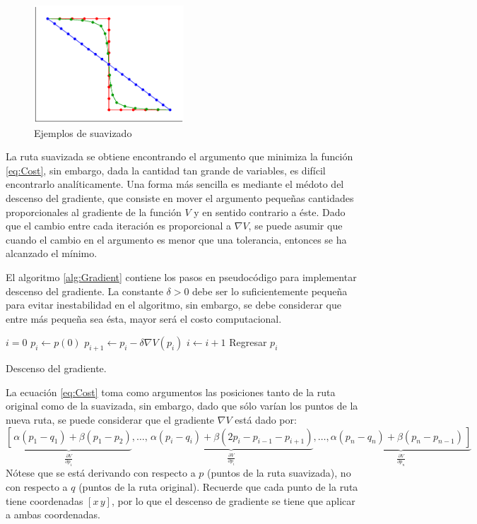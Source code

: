 \documentclass[letterpaper,12pt]{article}
\newcommand\ddfrac[2]{\frac{\displaystyle #1}{\displaystyle #2}}
\begin{document}
\begin{figure}
\centering
\includegraphics[width=0.5\textwidth]{Figures/Smooth.eps}
\caption{Ejemplos de suavizado}
\label{fig:Smooth}
\end{figure}

La ruta suavizada se obtiene encontrando el argumento que minimiza la función \ref{eq:Cost}, sin embargo, dada la cantidad tan grande de variables, es difícil encontrarlo analíticamente. Una forma más sencilla es mediante el médoto del descenso del gradiente, que consiste en mover el argumento pequeñas cantidades proporcionales al gradiente de la función $V$ y en sentido contrario a éste. Dado que el cambio entre cada iteración es proporcional a $\nabla V$, se puede asumir que cuando el cambio en el argumento es menor que una tolerancia, entonces se ha alcanzado el mínimo. 

El algoritmo \ref{alg:Gradient} contiene los pasos en pseudocódigo para implementar descenso del gradiente. La constante $\delta > 0$ debe ser lo suficientemente pequeña para evitar inestabilidad en el algoritmo, sin embargo, se debe considerar que entre más pequeña sea ésta, mayor será el costo computacional. 

\begin{algorithm}
\DontPrintSemicolon
{}
$i = 0$\;
$p_i \leftarrow p(0)$\;
{
\BlankLine
  $p_{i+1} \leftarrow p_i - \delta\nabla V(p_i)$\;
  $i \leftarrow i+1$
\BlankLine
}
Regresar $p_i$
\caption{Descenso del gradiente.}
\label{alg:Gradient}
\end{algorithm}

La ecuación \ref{eq:Cost} toma como argumentos las posiciones tanto de la ruta original como de la suavizada, sin embargo, dado que sólo varían los puntos de la nueva ruta, se puede considerar que el gradiente $\nabla V$ está dado por:
\begin{equation}
\underbrace{\left[\frac{}{}\alpha(p_1 - q_1)+\beta(p_1 - p_2)\right.}_{\ddfrac{\partial V}{\partial p_1}}
,\dots ,
\underbrace{\frac{}{}\alpha(p_i - q_i) + \beta(2p_i - p_{i-1} - p_{i+1})}_{\ddfrac{\partial V}{\partial p_i}}
,\dots ,
\underbrace{\left.\alpha(p_n-q_n)+\beta(p_n - p_{n-1})\frac{}{}\right]}_{\ddfrac{\partial V}{\partial p_n}}
\end{equation}
Nótese que se está derivando con respecto a $p$ (puntos de la ruta suavizada), no con respecto a $q$ (puntos de la ruta original). Recuerde que cada punto de la ruta tiene coordenadas $[x\,y]$, por lo que el descenso de gradiente se tiene que aplicar a ambas coordenadas. 
\end{document}
